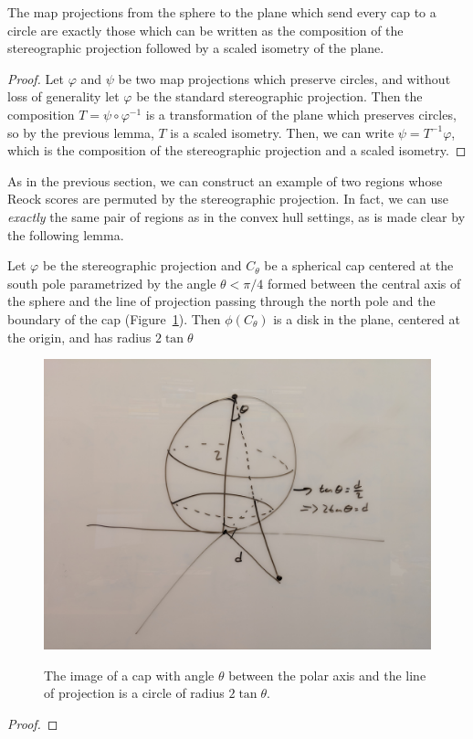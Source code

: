 {\begin{lemma}
The map projections from the sphere to the plane which send every cap to a circle are exactly those which can be written as the composition of the stereographic projection followed by a scaled isometry of the plane.
\end{lemma}
\begin{proof}
Let $\varphi$ and $\psi$ be two map projections which preserve circles, 
and without loss of generality let $\varphi$ be the standard stereographic projection.  
Then the composition $T=\psi\circ\varphi^{-1}$ is a transformation of the plane which preserves circles, so by the previous lemma, $T$ is a scaled isometry.  Then, we can write 
$\psi= T^{-1}\varphi$, which is the composition of the stereographic projection and a scaled isometry.
\end{proof}

As in the previous section, we can construct an example of two regions whose Reock scores are permuted by the stereographic projection.  In fact, we can use \textit{exactly} the same pair of regions as in the convex hull settings, as is made clear by the following lemma.



\begin{lemma}
Let $\varphi$ be the stereographic projection and $C_\theta$ be a spherical cap centered at the south pole parametrized by the angle $\theta <\pi/4$ formed between the central axis of the sphere and the line of projection passing through the north pole and the boundary of the cap (Figure~\ref{fig:stereocap}). Then $\phi(C_\theta)$ is a disk in the plane, centered at the origin, and has radius $2\tan\theta$
\end{lemma}
\begin{figure}
    \centering
    \includegraphics[width=.8\textwidth]{figs/stereo_cap.jpg}\\
    \caption{ The image of a cap with angle $\theta$ between the polar axis and the line of projection is a circle of radius $2\tan\theta$.  }
    \label{fig:stereocap}
\end{figure}
\begin{proof}



\end{proof}}
